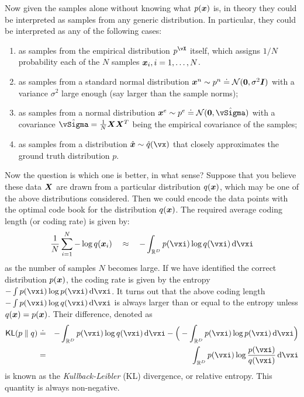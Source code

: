 \documentclass[../../book-main.tex]{subfiles}
\begin{document}
Now given the samples alone without knowing what $p(\bm{x})$ is, in theory they could be interpreted as samples from any generic distribution. In particular, they could be interpreted as any of the following cases:
\begin{enumerate}
	\item as samples from the empirical distribution $p^{\vX}$ itself, which assigns $1/N$ probability each of the $N$ samples $\bm{x}_i, i=1, \ldots, N$.
	\item as samples from a standard normal distribution $\bm{x}^n \sim p^{n} \doteq \mathcal{N}(\boldsymbol{0}, \sigma^2 \boldsymbol{I})$ with a variance $\sigma^2$ large enough (say larger than the sample norms);
	\item as samples from a normal distribution $\x^e \sim p^{e} \doteq \mathcal{N}(\boldsymbol{0}, \hat{\vSigma})$ with a covariance $\hat{\vSigma} = \frac{1}{N} \X \X^T$ being the empirical covariance of the samples;
	\item as samples from a distribution $\hat \x \sim \hat{q}(\vx)$ that closely approximates the ground truth  distribution $p$.
\end{enumerate}
Now the question is which one is better, in what sense? Suppose that you believe these data $\bm{X}$ are drawn from a particular distribution  $q(\bm{x})$, which may be one of the above distributions considered. Then we could encode the data points with the optimal code book for the distribution $q(\bm{x})$. The required average coding length (or coding rate) is given by:
\begin{equation}
	\frac{1}{N}\sum_{i=1}^N -\log q(\x_i) \quad \approx \quad - \int_{\R^{D}} p(\vxi) \log q(\vxi)\odif{\vxi}
\end{equation}
as the number of samples $N$ becomes large. If we have identified the correct distribution $p(\bm{x})$, the coding rate is given by the entropy $- \int p(\vxi) \log p(\vxi) \odif{\vxi}$. It turns out that the above coding length $- \int p(\vxi) \log q(\vxi) \odif{\vxi}$ is always larger than or equal to the entropy unless $q(\bm{x}) = p(\bm{x})$. Their difference, denoted as
\begin{eqnarray}
	\KL(p \mmid q) &\doteq& - \int_{\R^{D}} p(\vxi) \log q(\vxi) \odif{\vxi}  - \Big(- \int_{\R^{D}} p(\vxi) \log p(\vxi) \odif{\vxi} \Big)\\
	&=& \int_{\R^{D}} p(\vxi) \log \frac{p(\vxi)}{q(\vxi)} \odif{\vxi}
\end{eqnarray}
is known as the {\em Kullback-Leibler} (KL) divergence, or relative entropy. This quantity is always non-negative.
\end{document}
